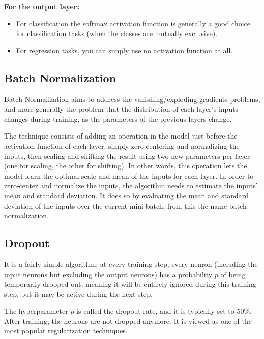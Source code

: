 \documentclass[%
oneside,                 %
final,                   %
10pt]{article}
\begin{document}
\textbf{For the output layer:}

\begin{itemize}
\item For classification the softmax activation function is generally a good choice for classification tasks (when the classes are mutually exclusive).

\item For regression tasks, you can simply use no activation function at all.
\end{itemize}

\noindent
\subsection{Batch Normalization}

Batch Normalization aims to address the vanishing/exploding gradients
problems, and more generally the problem that the distribution of each
layer’s inputs changes during training, as the parameters of the
previous layers change.

The technique consists of adding an operation in the model just before
the activation function of each layer, simply zero-centering and
normalizing the inputs, then scaling and shifting the result using two
new parameters per layer (one for scaling, the other for shifting). In
other words, this operation lets the model learn the optimal scale and
mean of the inputs for each layer.  In order to zero-center and
normalize the inputs, the algorithm needs to estimate the inputs’ mean
and standard deviation. It does so by evaluating the mean and standard
deviation of the inputs over the current mini-batch, from this the
name batch normalization.

\subsection{Dropout}

It is a fairly simple algorithm: at every training step, every neuron
(including the input neurons but excluding the output neurons) has a
probability $p$ of being temporarily dropped out, meaning it will be
entirely ignored during this training step, but it may be active
during the next step.

The hyperparameter $p$ is called the dropout rate, and it is typically
set to 50\%. After training, the neurons are not dropped anymore.  It
is viewed as one of the most popular regularization techniques.
\end{document}

